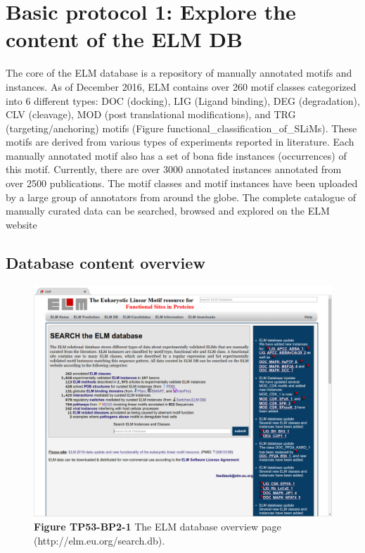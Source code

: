 \section{Basic protocol 1: Explore the content of the ELM
DB}\label{basic-protocol-1-explore-the-content-of-the-elm-db}

The core of the ELM database is a repository of manually annotated
motifs and instances. As of December 2016, ELM contains over 260 motif
classes categorized into 6 different types: DOC (docking), LIG (Ligand
binding), DEG (degradation), CLV (cleavage), MOD (post translational
modifications), and TRG (targeting/anchoring) motifs (Figure
functional\_classification\_of\_SLiMs). These motifs are derived from
various types of experiments reported in literature. Each manually
annotated motif also has a set of bona fide instances (occurrences) of
this motif. Currently, there are over 3000 annotated instances annotated
from over 2500 publications. The motif classes and motif instances have
been uploaded by a large group of annotators from around the globe. The
complete catalogue of manually curated data can be searched, browsed and
explored on the ELM website

\subsection{Database content overview}\label{database-content-overview}

\begin{figure}[h!]
\centering
\includegraphics[width=\textwidth]{Figures/TP53_2/stats.png} 
\caption{
\textbf{Figure TP53-BP2-1}
The ELM database overview page (http://elm.eu.org/search.db).
}
\end{figure}

